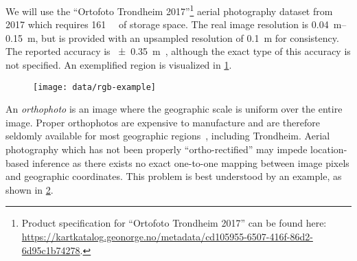 We will use the \enquote{Ortofoto Trondheim 2017}\footnote{Product specification for \enquote{Ortofoto Trondheim 2017} can be found here:\\ \url{https://kartkatalog.geonorge.no/metadata/cd105955-6507-416f-86d2-6d95c1b74278}.} aerial photography dataset from 2017 which requires \SI{161}{\giga\byte} of storage space.
The real image resolution is \SIrange{0.04}{0.15}{\meter}, but is provided with an upsampled resolution of \SI{0.1}{\meter} for consistency.
The reported accuracy is \SI{\pm 0.35}{\meter}~\cite{trondheim_ortophoto_2017}, although the exact type of this accuracy is not specified.
An exemplified region is visualized in \cref{fig:rgb-example}.

\begin{figure}[H]
  \centering
  \texttt{[image: data/rgb-example]}
  \label{fig:rgb-example}
\end{figure}

An \textit{orthophoto} is an image where the geographic scale is uniform over the entire image.
Proper orthophotos are expensive to manufacture and are therefore seldomly available for most geographic regions~\cite{ortofoto_in_norway_2003}, including Trondheim.
Aerial photography which has not been properly \enquote{ortho-rectified} may impede location-based inference as there exists no exact one-to-one mapping between image pixels and geographic coordinates.
This problem is best understood by an example, as shown in \cref{fig:non-orthophoto-example}.

\begin{figure}[H]
  \centering
  \label{fig:non-orthophoto-example}
\end{figure}

